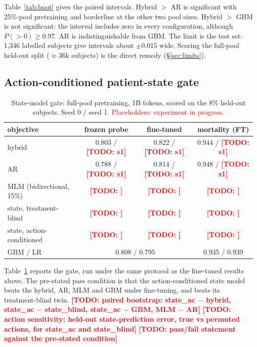 \documentclass[10pt,letterpaper]{article}
\newcommand{\todo}[1]{\textcolor{red}{\textbf{[TODO: #1]}}}
\begin{document}
Table~\ref{tab:boot} gives the paired intervals. Hybrid $>$ AR is
significant with 25\%-pool pretraining and borderline at the other two pool sizes.
Hybrid $>$ GBM is not significant: the interval includes zero in every
configuration, although $P(>0)\ge 0.97$. AR is indistinguishable from GBM. The
limit is the test set: 1{,}346 labelled subjects give intervals about
$\pm0.015$ wide. Scoring the full-pool held-out split ($\approx$36k subjects) is
the direct remedy (\S\ref{sec:limits}).

\subsection{Action-conditioned patient-state gate}
\label{sec:gate}

\begin{table}[t]
\centering\small
\caption{State-model gate: full-pool pretraining, 1B tokens, scored on the 8\%
held-out subjects. Seed 0 / seed 1. \textcolor{red}{Placeholders: experiment in
progress.}}
\label{tab:gate}
\begin{tabular}{lccc}
\toprule
objective & frozen probe & fine-tuned & mortality (FT) \\
\midrule
hybrid                         & 0.803 / \todo{s1} & 0.822 / \todo{s1} & 0.944 / \todo{s1} \\
AR                             & 0.788 / \todo{s1} & 0.814 / \todo{s1} & 0.948 / \todo{s1} \\
MLM (bidirectional, 15\%)      & \todo{} & \todo{} & \todo{} \\
state, treatment-blind         & \todo{} & \todo{} & \todo{} \\
state, action-conditioned      & \todo{} & \todo{} & \todo{} \\
\midrule
GBM / LR                       & \multicolumn{2}{c}{0.808 / 0.795} & 0.935 / 0.939 \\
\bottomrule
\end{tabular}
\end{table}

Table~\ref{tab:gate} reports the gate, run under the same protocol as the fine-tuned results above. The pre-stated pass
condition is that the action-conditioned state model beats the hybrid, AR, MLM
and GBM under fine-tuning, and beats its treatment-blind twin.
\todo{paired bootstrap: state\_ac $-$ hybrid, state\_ac $-$ state\_blind, state\_ac $-$ GBM, MLM $-$ AR}
\todo{action sensitivity: held-out state-prediction error, true vs permuted actions, for state\_ac and state\_blind}
\todo{pass/fail statement against the pre-stated condition}
\end{document}

